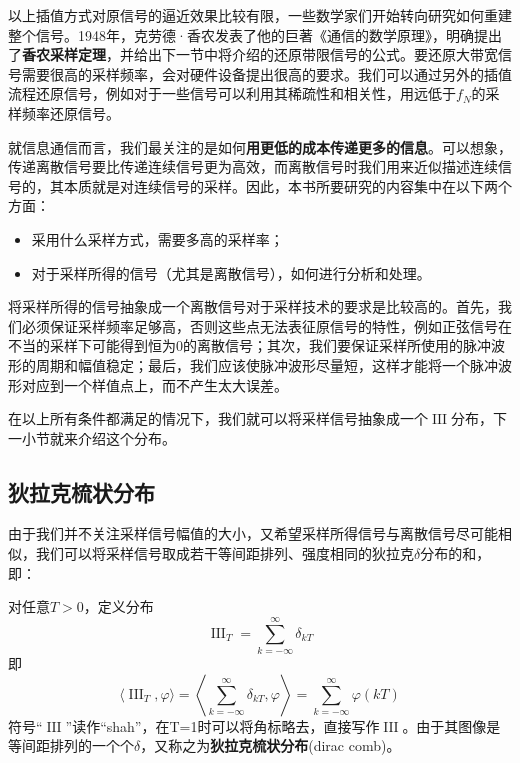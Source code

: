 \documentclass{ctexbook}
\newcommand{\shah}{\operatorname{III}}
\begin{document}
以上插值方式对原信号的逼近效果比较有限，一些数学家们开始转向研究如何重建整个信号。1948年，克劳德·香农发表了他的巨著《通信的数学原理》，明确提出了\textbf{香农采样定理}，并给出下一节中将介绍的还原带限信号的公式。要还原大带宽信号需要很高的采样频率，会对硬件设备提出很高的要求。我们可以通过另外的插值流程还原信号，例如对于一些信号可以利用其稀疏性和相关性，用远低于$f_N$的采样频率还原信号。

就信息通信而言，我们最关注的是如何\textbf{用更低的成本传递更多的信息}。可以想象，传递离散信号要比传递连续信号更为高效，而离散信号时我们用来近似描述连续信号的，其本质就是对连续信号的采样。因此，本书所要研究的内容集中在以下两个方面：\begin{itemize}
    \item 采用什么采样方式，需要多高的采样率；
    \item 对于采样所得的信号（尤其是离散信号），如何进行分析和处理。
\end{itemize}

将采样所得的信号抽象成一个离散信号对于采样技术的要求是比较高的。首先，我们必须保证采样频率足够高，否则这些点无法表征原信号的特性，例如正弦信号在不当的采样下可能得到恒为0的离散信号；其次，我们要保证采样所使用的脉冲波形的周期和幅值稳定；最后，我们应该使脉冲波形尽量短，这样才能将一个脉冲波形对应到一个样值点上，而不产生太大误差。

在以上所有条件都满足的情况下，我们就可以将采样信号抽象成一个$\shah$分布，下一小节就来介绍这个分布。

\subsection{狄拉克梳状分布}\label{sub:dirac_comb}
由于我们并不关注采样信号幅值的大小，又希望采样所得信号与离散信号尽可能相似，我们可以将采样信号取成若干等间距排列、强度相同的狄拉克$\delta$分布的和，即：
\begin{definition}[狄拉克梳状分布]
    对任意$T>0$，定义分布
    \begin{equation*}
        \shah_T=\sum_{k=-\infty}^{\infty}\delta_{kT}
    \end{equation*}
    即\[\langle \shah_T,\varphi\rangle=\left\langle \sum_{k=-\infty}^{\infty}\delta_{kT},\varphi\right\rangle=\sum_{k=-\infty}^{\infty}\varphi(kT)\]
    符号“$\shah$”读作“shah”，在T=1时可以将角标略去，直接写作$\shah$\cite{brad_osgood_ee261}。由于其图像是等间距排列的一个个$\delta$，又称之为\textbf{狄拉克梳状分布}(dirac comb)。
\end{definition}
\end{document}
